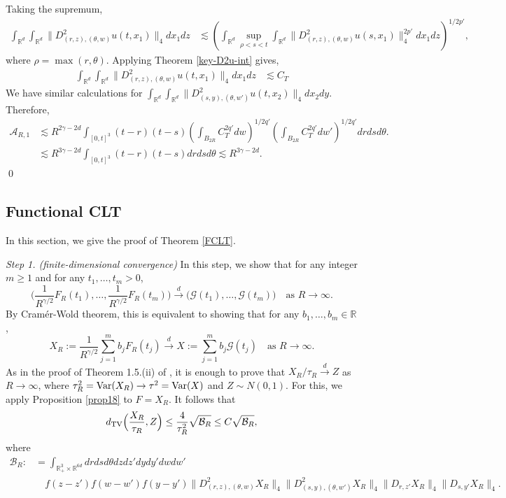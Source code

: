 \documentclass[12pt]{article}
\def\cA{\mathcal{A}}
\def\cB{\mathcal{B}}
\def\cG{\mathcal{G}}
\def\bR{\mathbb{R}}
\newcommand{\les}{\lesssim}
\begin{document}
Taking the supremum,   
\begin{align*}
 \int_{\bR^d} \int_{\bR^d} \| D_{(r,z),(\theta,w)}^2 u(t,x_1) \|_4 dx_1 dz & \les \left(\int_{\bR^d} \sup_{\rho < s < t}\int_{\bR^d} \| D_{(r,z),(\theta,w)}^2 u(s,x_1) \|^{2p'}_4 dx_1 dz \right)^{1/2p'}, 
\end{align*}
where $\rho = \max(r,\theta)$. Applying Theorem \ref{key-D2u-int} gives,
\begin{align*}
 \int_{\bR^d} \int_{\bR^d} \| D_{(r,z),(\theta,w)}^2 u(t,x_1) \|_4 dx_1 dz & \les C_T 
\end{align*}
We have similar calculations for $\int_{\bR^d}\int_{\bR^d} \| D_{(s,y),(\theta,w')}^2 u(t,x_2)\|_4 dx_2 dy$. Therefore,   
\begin{align*}
\cA_{R,1} & \les R^{2\gamma-2d}\int_{[0,t]^3}(t-r)(t-s) \left(\int_{B_{2R}} C_T^{2q'} dw\right)^{1/2q'}  \left(\int_{B_{2R}} C_T^{2q'} dw'\right)^{1/2q'}  drdsd\theta. \\
& \les R^{3\gamma-2d} \int_{[0,t]^3} (t-r)(t-s) drdsd\theta \les R^{3\gamma-2d}.
\end{align*}
\qed
\subsection{Functional CLT}

In this section, we give the proof of Theorem \ref{FCLT}.

{\em Step 1. (finite-dimensional convergence)} In this step, we show that for any integer $m\geq 1$ and for any $t_1,\ldots,t_m>0$,
\[
\Big(\frac{1}{R^{\gamma/2}} F_R(t_1),\ldots, \frac{1}{R^{\gamma/2}}F_R(t_m)  \Big)
\stackrel{d}{\to} \Big(\cG(t_1),\ldots, \cG(t_m) \Big) \quad \mbox{as $R \to \infty$}.
\]
By Cram\'er-Wold theorem, this is equivalent to showing that for any $b_1,\ldots,b_m \in \bR$,
\[
X_R:=\frac{1}{R^{\gamma/2}}\sum_{j=1}^{m}b_jF_R(t_j) \stackrel{d}{\to}X:=\sum_{j=1}^{m}b_j \cG(t_j) 
\quad \mbox{as $R \to \infty$}.
\]
As in the proof of Theorem 1.5.(ii) of \cite{BS26}, it is enough to prove that $X_R/\tau_R \stackrel{d}{\to} Z$ as $R \to \infty$, where $\tau_R^2={\rm Var}(X_R) \to \tau^2={\rm Var}(X)$ and $Z \sim N(0,1)$. For this, we apply Proposition \ref{prop18} to $F=X_R$. It follows that
\begin{equation}
\label{bound-BR}
d_{\rm TV}\Big( \frac{X_R}{\tau_R},  Z\Big) \leq \frac{4}{\tau_R^2} \sqrt{\cB_R} \leq C \sqrt{\cB_R},
\end{equation}
where 
\begin{align*}
\cB_R:&= \int_{\bR_+^3\times\bR^{6d}} dr ds d\theta  dzdz' dydy' dwdw'  \\
&\quad  f(z-z') f(w-w') f(y-y')  \| D_{(r,z),(\theta,w)}^2 X_R \|_4  \| D_{(s,y),(\theta,w')}^2 X_R \|_4  \| D_{r,z'} X_R\|_4 \| D_{s, y' }X_R \|_4.
\end{align*}
\end{document}
